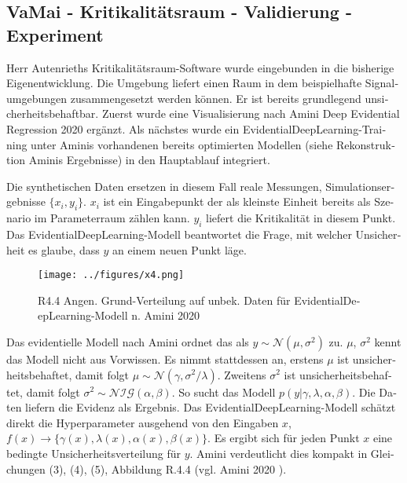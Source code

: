 \begin{otherlanguage}{ngerman}
\subsection*{VaMai - Kritikalitätsraum - Validierung - Experiment}

Herr Autenrieths Kritikalitätsraum-Software wurde eingebunden in die bisherige Eigenentwicklung. Die Umgebung liefert einen Raum in dem beispielhafte Signalumgebungen 
zusammengesetzt werden können. Er ist bereits grundlegend unsicherheitsbehaftbar. Zuerst wurde eine Visualisierung nach Amini Deep Evidential Regression 2020 ergänzt. Als nächstes wurde ein \gls{EvidentialDeepLearning}-Training unter Aminis vorhandenen bereits optimierten Modellen (siehe Rekonstruktion Aminis Ergebnisse) in den Hauptablauf integriert. 

Die synthetischen Daten ersetzen in diesem Fall reale Messungen, Simulationsergebnisse $\{ x_{i}, y_{i} \}$. $x_{i}$ ist ein Eingabepunkt der als kleinste Einheit bereits als Szenario im Parameterraum zählen kann. $y_{i}$ liefert die Kritikalität in diesem Punkt. Das \gls{EvidentialDeepLearning}-Modell beantwortet die Frage, mit welcher Unsicherheit es glaube, dass $y$ an einem neuen Punkt läge. 

\begin{figure}[!ht]
  \centering
  \texttt{[image: ../figures/x4.png]}
  \caption{R4.4 Angen. Grund-Verteilung auf unbek. Daten für \gls{EvidentialDeepLearning}-Modell n. Amini 2020}
\end{figure}

Das evidentielle Modell nach Amini ordnet das als $y \sim \mathcal{N}(\mu, \sigma^2)$ zu. $\mu$, $\sigma^2$ kennt das Modell nicht aus Vorwissen. Es nimmt stattdessen an, erstens $\mu$ ist unsicherheitsbehaftet, damit folgt $\mu \sim \mathcal{N}(\gamma, \sigma^{2} / \lambda)$. Zweitens $\sigma^{2}$ ist unsicherheitsbehaftet, damit folgt $\sigma^{2} \sim \mathcal{NIG}(\alpha, \beta)$. So sucht das Modell $p(y|\gamma,\lambda,\alpha,\beta)$. Die Daten liefern die Evidenz als Ergebnis. Das \gls{EvidentialDeepLearning}-Modell schätzt direkt die Hyperparameter ausgehend von den Eingaben $x$, $f(x) \rightarrow \{ \gamma(x), \lambda(x), \alpha(x), \beta(x) \}$. Es ergibt sich für jeden Punkt $x$ eine bedingte Unsicherheitsverteilung für $y$. Amini verdeutlicht dies kompakt in Gleichungen (3), (4), (5), Abbildung R.4.4 (vgl. Amini 2020 \parencite{amini2020}). 


\end{otherlanguage}
